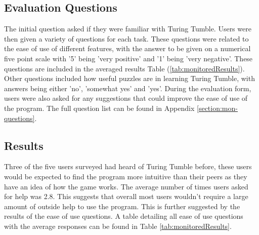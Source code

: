 \documentclass{l4proj}
\begin{document}
\subsection{Evaluation Questions}
\label{section:monitored-questions}
The initial question asked if they were familiar with Turing Tumble. Users were then given a variety of questions for each task. These questions were related to the ease of use of different features, with the answer to be given on a numerical five point scale with '5' being 'very positive' and '1' being 'very negative'. These questions are included in the averaged results Table (\ref{tab:monitoredResults}). Other questions included how useful puzzles are in learning Turing Tumble, with answers being either 'no', 'somewhat yes' and 'yes'. During the evaluation form, users were also asked for any suggestions that could improve the ease of use of the program. The full question list can be found in Appendix \ref{section:mon-questions}.


\subsection{Results}
Three of the five users surveyed had heard of Turing Tumble before, these users would be expected to find the program more intuitive than their peers as they have an idea of how the game works. The average number of times users asked for help was 2.8. This suggests that overall most users wouldn't require a large amount of outside help to use the program. This is further suggested by the results of the ease of use questions. A table detailing all ease of use questions with the average responses can be found in Table \ref{tab:monitoredResults}.
\end{document}

